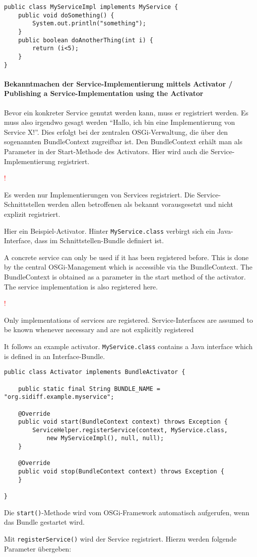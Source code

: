 \documentclass[10pt,a4paper]{scrartcl}
\newcommand{\hinweis}[1]{
\begin{framed}
\begin{minipage}[t]{0.02\textwidth}
\textcolor{red}{\Huge{\sffamily !}}
\end{minipage}
\begin{minipage}[t]{0.94\textwidth}
#1
\end{minipage}
\end{framed}
}
\providecommand{\deng}[2]{#1 / {\sffamily #2}}
\providecommand{\deutsch}[1]{#1}
\providecommand{\englisch}[1]{{\sffamily #1}}
\begin{document}
\begin{lstlisting}
public class MyServiceImpl implements MyService {
	public void doSomething() {
		System.out.println("something");
	}
	public boolean doAnotherThing(int i) {
		return (i<5);
	}
}
\end{lstlisting}


\paragraph{\deng{Bekanntmachen der Service-Implementierung mittels Activator}{Publishing a Service-Implementation using the Activator}}
\deutsch{Bevor ein konkreter Service genutzt werden kann, muss er registriert werden. Es
muss also irgendwo gesagt werden ``Hallo, ich bin eine Implementierung von
Service X!''. Dies erfolgt bei der zentralen OSGi-Verwaltung, die über den
sogenannten BundleContext zugreifbar ist. Den BundleContext erhält man als
Parameter in der Start-Methode des Activators. Hier wird auch die
Service-Implementierung registriert.

\hinweis{Es werden nur Implementierungen von Services registriert. Die
Service-Schnittstellen werden allen betroffenen als bekannt vorausgesetzt und
nicht explizit registriert.}

Hier ein Beispiel-Activator. Hinter \texttt{MyService.class} verbirgt sich ein Java-Interface, dass im
Schnittstellen-Bundle definiert ist.}

\englisch{A concrete service can only be used if it has been registered before. This is done by the central OSGi-Management which is accessible via the BundleContext. The BundleContext is obtained as a parameter in the start method of the activator. The service implementation is also registered here.

\hinweis{Only implementations of services are registered. Service-Interfaces are assumed to be known whenever necessary and are not explicitly registered }

It follows an example activator. \texttt{MyService.class} contains a Java interface which is defined in an Interface-Bundle.}

\begin{lstlisting}
public class Activator implements BundleActivator {

	public static final String BUNDLE_NAME = "org.sidiff.example.myservice";

	@Override
	public void start(BundleContext context) throws Exception {
		ServiceHelper.registerService(context, MyService.class, 
			new MyServiceImpl(), null, null);
	}

	@Override
	public void stop(BundleContext context) throws Exception {
	}

}
\end{lstlisting}
\deutsch{Die \texttt{start()}-Methode wird vom OSGi-Framework automatisch aufgerufen,
wenn das Bundle gestartet wird. 

Mit \texttt{registerService()} wird der Service registriert. Hierzu werden folgende
Parameter übergeben:}
\end{document}
